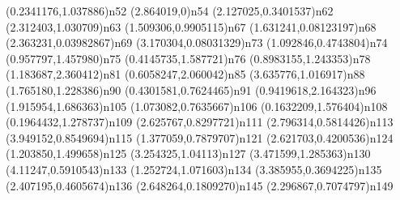 \dotnode[](0.2341176,1.037886){n52}
\dotnode[](2.864019,0){n54}
\dotnode[](2.127025,0.3401537){n62}
\dotnode[](2.312403,1.030709){n63}
\dotnode[](1.509306,0.9905115){n67}
\dotnode[](1.631241,0.08123197){n68}
\dotnode[](2.363231,0.03982867){n69}
\dotnode[](3.170304,0.08031329){n73}
\dotnode[](1.092846,0.4743804){n74}
\dotnode[](0.957797,1.457980){n75}
\dotnode[](0.4145735,1.587721){n76}
\dotnode[](0.8983155,1.243353){n78}
\dotnode[](1.183687,2.360412){n81}
\dotnode[](0.6058247,2.060042){n85}
\dotnode[](3.635776,1.016917){n88}
\dotnode[](1.765180,1.228386){n90}
\dotnode[](0.4301581,0.7624465){n91}
\dotnode[](0.9419618,2.164323){n96}
\dotnode[](1.915954,1.686363){n105}
\dotnode[](1.073082,0.7635667){n106}
\dotnode[](0.1632209,1.576404){n108}
\dotnode[](0.1964432,1.278737){n109}
\dotnode[](2.625767,0.8297721){n111}
\dotnode[](2.796314,0.5814426){n113}
\dotnode[](3.949152,0.8549694){n115}
\dotnode[](1.377059,0.7879707){n121}
\dotnode[](2.621703,0.4200536){n124}
\dotnode[](1.203850,1.499658){n125}
\dotnode[](3.254325,1.04113){n127}
\dotnode[](3.471599,1.285363){n130}
\dotnode[](4.11247,0.5910543){n133}
\dotnode[](1.252724,1.071603){n134}
\dotnode[](3.385955,0.3694225){n135}
\dotnode[](2.407195,0.4605674){n136}
\dotnode[](2.648264,0.1809270){n145}
\dotnode[](2.296867,0.7074797){n149}
